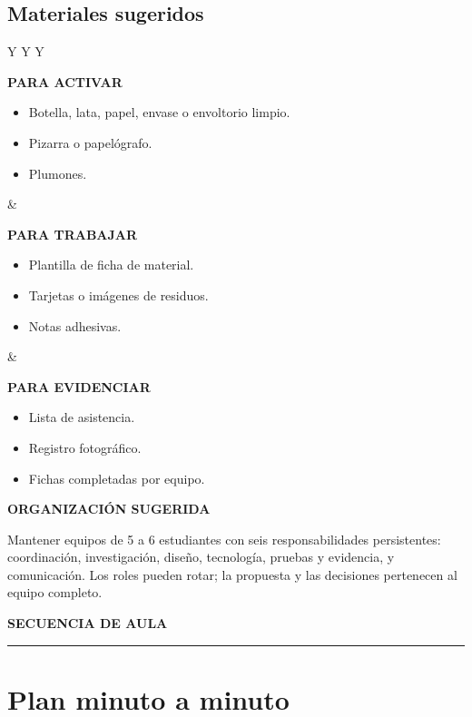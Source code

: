 ﻿\documentclass[10pt,a4paper]{article}
\newcommand{\kicker}[1]{%
  {\color{AIEPRed}\scriptsize\bfseries\MakeUppercase{#1}}\par\vspace{2.5mm}
  {\color{AIEPRed}\rule{13mm}{1.2pt}}\vspace{3mm}
}
\newcommand{\labeltext}[1]{%
  {\scriptsize\bfseries\color{AIEPSlate}\MakeUppercase{#1}}\par\vspace{1.3mm}
}
\newcommand{\pagebreaksection}{\newpage}
\begin{document}
\subsection*{Materiales sugeridos}
\begin{tabularx}{\textwidth}{Y Y Y}
\begin{card}[height=35mm,valign=top]
\labeltext{Para activar}
\begin{itemize}
  \item Botella, lata, papel, envase o envoltorio limpio.
  \item Pizarra o papelógrafo.
  \item Plumones.
\end{itemize}
\end{card}
&
\begin{card}[height=35mm,valign=top]
\labeltext{Para trabajar}
\begin{itemize}
  \item Plantilla de ficha de material.
  \item Tarjetas o imágenes de residuos.
  \item Notas adhesivas.
\end{itemize}
\end{card}
&
\begin{card}[height=35mm,valign=top]
\labeltext{Para evidenciar}
\begin{itemize}
  \item Lista de asistencia.
  \item Registro fotográfico.
  \item Fichas completadas por equipo.
\end{itemize}
\end{card}
\end{tabularx}

\vspace{4mm}
\begin{card}
\labeltext{Organización sugerida}
Mantener equipos de 5 a 6 estudiantes con seis responsabilidades persistentes: coordinación, investigación, diseño, tecnología, pruebas y evidencia, y comunicación. Los roles pueden rotar; la propuesta y las decisiones pertenecen al equipo completo.
\end{card}

\pagebreaksection

\kicker{Secuencia de aula}
\section*{Plan minuto a minuto}
\end{document}
